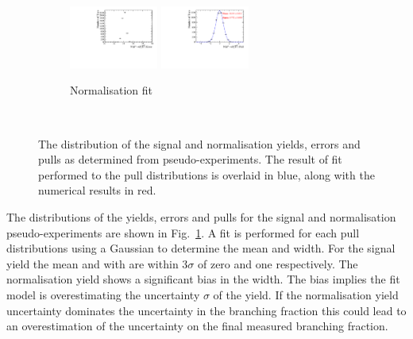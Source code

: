 \begin{figure}[!h]
\begin{subfigure}[t]{1.0\textwidth}
      \includegraphics[width=0.32\textwidth]{figs/B2DsKK/Plots_DsD0_nsig_err.pdf}
      \includegraphics[width=0.32\textwidth]{figs/B2DsKK/Plots_DsD0_nsig_pul.pdf}
      \caption{Normalisation fit}
   \end{subfigure}\\
   \caption{The distribution of the signal and normalisation yields, errors and pulls as determined from pseudo-experiments. The result of fit performed to the pull distributions is overlaid in blue, along with the numerical results in red.}
   \label{fig:B2DsKK_Pulls}
\end{figure}

The distributions of the yields, errors and pulls for the signal and normalisation pseudo-experiments are shown in Fig.~\ref{fig:B2DsKK_Pulls}. A fit is performed for each pull distributions using a Gaussian to determine the mean and width. 
For the signal yield the mean and with are within $3\sigma$ of zero and one respectively. The normalisation yield shows a significant bias in the width. The bias implies the fit model is overestimating the uncertainty $\sigma$ of the yield.
If the normalisation yield uncertainty dominates the uncertainty in the branching fraction this could lead to an overestimation of the uncertainty on the final measured branching fraction.

